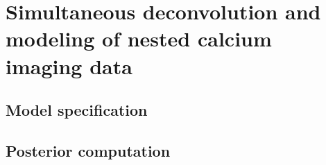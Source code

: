 \chapter{Simultaneous deconvolution and modeling of nested calcium imaging data}



\section{Model specification} 

\section{Posterior computation}
